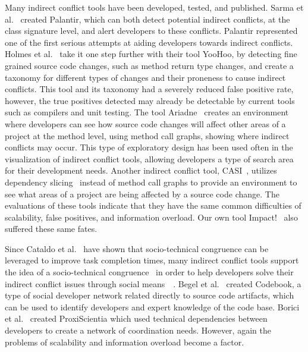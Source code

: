 \documentclass[conference]{IEEEtran}
\begin{document}
Many indirect conflict tools have been developed, tested, and published. Sarma et al.~\cite{Sarma:2007:TSA} created Palantir,
which can both detect potential indirect conflicts, at the class signature level, and alert developers to these conflicts.
Palantir represented one of the first serious attempts at aiding developers towards indirect conflicts. Holmes et
al.~\cite{Holmes:2010:CAR} take it one step further with their tool YooHoo, by detecting fine grained source code changes,
such as method return type changes, and create a taxonomy for different types of changes and their proneness to cause
indirect conflicts. This tool and its taxonomy had a severely reduced false positive rate, however, the true positives
detected may already be detectable by current tools such as compilers and unit testing. The tool Ariadne~\cite{Trainer:2005:BGT}
creates an environment where developers can see how source code changes will affect other areas of a project at the
method level, using method call graphs, showing where indirect conflicts may occur. This type of exploratory design has
been used often in the visualization of indirect conflict tools, allowing developers a type of search area for their development
needs. Another indirect conflict tool, CASI~\cite{Servant:2010:CPI}, utilizes dependency slicing~\cite{Bajracharya:2009:SIS}
instead of method call graphs to provide an environment to see what areas of a project are being affected by a source code change.
The evaluations of these tools indicate that they have the same common difficulties of scalability, false positives, and information overload. Our own tool
Impact!~\cite{Ell:2013} also suffered these same fates.

Since Cataldo et al.~\cite{Cataldo:2006:ICR} have shown that socio-technical congruence can be leveraged to improve task completion
times, many indirect conflict tools support the idea of a socio-technical congruence~\cite{Kwan:2011:ESC} in order to help
developers solve their indirect conflict issues through social means~\cite{Begel:2010:CDE}~\cite{Borici:2012:CHA}.
Begel et al.~\cite{Begel:2010:CDE} created Codebook, a type of social developer network related directly to source code
artifacts, which can be used to identify developers and expert knowledge of the code base. Borici et al.~\cite{Borici:2012:CHA}
created ProxiScientia which used technical dependencies between developers to create a network of coordination needs.
However, again the problems of scalability and information overload become a factor.
\end{document}
